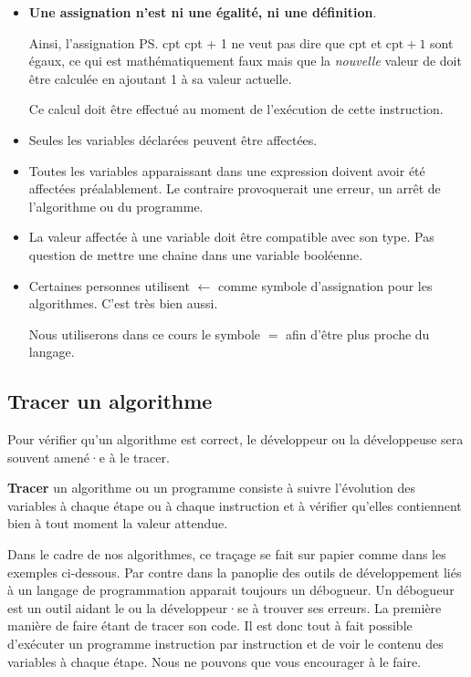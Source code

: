 				\begin{itemize}
				\item 
					\textbf{Une assignation n’est ni une égalité, 
					ni une définition}.
					
					Ainsi, l’assignation \ps{cpt \Gets cpt + 1} ne veut pas dire
					que $\textrm{cpt}$ et $\textrm{cpt} + 1$ sont égaux, ce qui
					est mathématiquement faux mais que la \emph{nouvelle} valeur
					de  doit être calculée en ajoutant 1 à sa valeur
					actuelle.  
					
					Ce calcul doit être effectué au moment de l'exécution
					de cette instruction. 
				
				\item 
					Seules les variables déclarées peuvent être affectées.
				\item 
					Toutes les variables apparaissant dans une expression
					doivent avoir été affectées préalablement. 
					Le contraire provoquerait une erreur,
					un arrêt de l’algorithme ou du programme.
				\item 
					La valeur affectée à une variable 
					doit être compatible avec son type.
					Pas question de mettre une chaine dans une variable
					booléenne.
				\item 
					Certaines personnes utilisent \textbf{$\leftarrow$} comme 
					symbole d'assignation pour les algorithmes. C'est très bien 
					aussi. 

					Nous utiliserons dans ce cours le symbole $=$ afin d'être plus
					proche du langage. 
				\end{itemize}
				
		\subsection{Tracer un algorithme}
		
			Pour vérifier qu’un algorithme est correct,
			le développeur ou la développeuse sera souvent amené·e à 
			le tracer.

			\textbf{Tracer} un algorithme ou un programme consiste à suivre
			l’évolution des variables à chaque étape ou à chaque instruction
			et à vérifier qu’elles contiennent bien à tout moment la valeur
			attendue.

			Dans le cadre de nos algorithmes, ce traçage se fait sur papier
			comme dans les exemples ci-dessous. Par contre dans la panoplie des
			outils de développement liés à un langage de programmation apparait
			toujours un débogueur. Un débogueur est un outil
			aidant le ou la développeur·se à trouver ses erreurs. La première
			manière de faire étant de tracer son code. Il est donc tout à fait
			possible d'exécuter un programme instruction par instruction et de
			voir le contenu des variables à chaque étape. Nous ne pouvons que
			vous encourager à le faire. 
			
